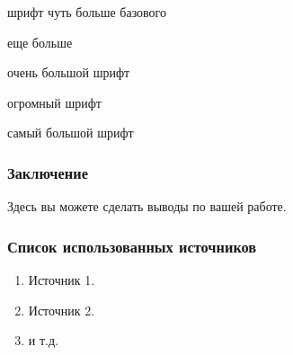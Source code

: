 \documentclass{beamer}
\begin{document}
{\begin{frame}
    \large шрифт чуть больше базового
    
    \Large еще больше
    
    \LARGE очень большой шрифт
    
    \huge огромный шрифт
    
    \Huge самый большой шрифт
    
\end{frame}


\begin{frame}
    \frametitle{Заключение}
    Здесь вы можете сделать выводы по вашей работе.
\end{frame}


\begin{frame}
\begin{onehalfspace}

    \frametitle{Список использованных источников}
\end{onehalfspace}
    \begin{enumerate}
        \item Источник 1.
        \item Источник 2.
        \item и т.д.
    \end{enumerate}
\end{frame}
}

\end{document}
